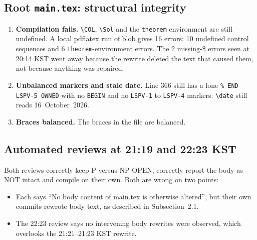 \documentclass[11pt]{article}
\begin{document}
\subsection{Root \texttt{main.tex}: structural integrity}
\begin{enumerate}
\item \textbf{Compilation fails.} \verb|\COL|, \verb|\Sol| and the
\texttt{theorem} environment are still undefined. A local pdflatex run
of blob  gives 16 errors: 10 undefined control sequences
and 6 \texttt{theorem}-environment errors. The 2 missing-\$ errors seen
at 20:14 KST went away because the rewrite deleted the text that caused
them, not because anything was repaired.
\item \textbf{Unbalanced markers and stale date.} Line 366 still has a
lone \verb|% END LSPV-5 OWNED| with no \texttt{BEGIN} and no
\texttt{LSPV-1} to \texttt{LSPV-4} markers. \verb|\date| still reads
16~October~2026.
\item \textbf{Braces balanced.} The braces in the file are balanced.
\end{enumerate}

\subsection{Automated reviews at 21:19 and 22:23 KST}
Both reviews correctly keep P versus NP OPEN, correctly report the body
as NOT intact and compile on their own. Both are wrong on two points:
\begin{itemize}
\item Each says ``No body content of main.tex is otherwise altered'',
but their own commits rewrote body text, as described in Subsection~2.1.
\item The 22:23 review says no intervening body rewrites were observed,
which overlooks the 21:21--21:23 KST rewrite.
\end{itemize}
\end{document}
